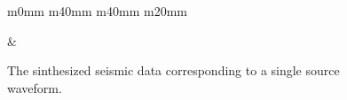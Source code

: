 \begin{figure}[t]
\begin{tabular}{m{0mm} m{40mm} m{40mm} m{20mm}}
\begin{minipage}[b]{\linewidth}
            \caption*{}
        \end{minipage} &
        \hspace{-3mm}
         \\
    \end{tabular}
    \caption{The sinthesized seismic data corresponding to a single source waveform.}
    \label{fig:observed-seismic-data}
\end{figure}
